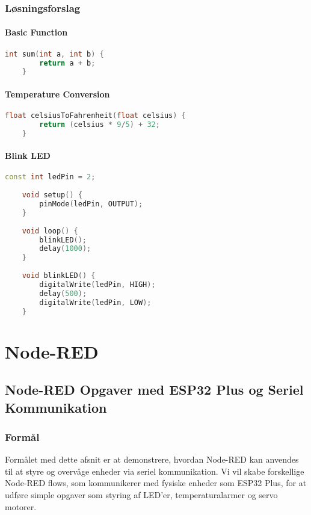 \clearpage

\subsection*{Løsningsforslag}

\subsubsection*{Basic Function}
\begin{lstlisting}[language=C++, caption=Sum function]
	int sum(int a, int b) {
		return a + b;
	}
\end{lstlisting}

\subsubsection*{Temperature Conversion}
\begin{lstlisting}[language=C++, caption=Celsius to Fahrenheit]
	float celsiusToFahrenheit(float celsius) {
		return (celsius * 9/5) + 32;
	}
\end{lstlisting}

\subsubsection*{Blink LED}
\begin{lstlisting}[language=C++, caption=Blink LED using functions]
	const int ledPin = 2; 
	
	void setup() {
		pinMode(ledPin, OUTPUT);
	}
	
	void loop() {
		blinkLED();
		delay(1000);
	}
	
	void blinkLED() {
		digitalWrite(ledPin, HIGH);
		delay(500);
		digitalWrite(ledPin, LOW);
	}
\end{lstlisting}
\clearpage
\chapter{Node-RED}
\section{Node-RED Opgaver med ESP32 Plus og Seriel Kommunikation}

\subsection{Formål}
Formålet med dette afsnit er at demonstrere, hvordan Node-RED kan anvendes til at styre og overvåge enheder via seriel kommunikation. Vi vil skabe forskellige Node-RED flows, som kommunikerer med fysiske enheder som ESP32 Plus, for at udføre simple opgaver som styring af LED'er, temperaturalarmer og servo motorer.

